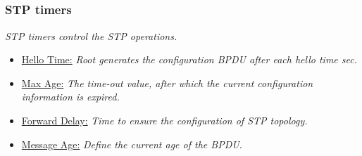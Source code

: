 \documentclass[10pt, blue,subsection=true, compress]{beamer}
\begin{document}
\subsection*{}
\begin{frame} \frametitle{STP timers }
\emph{STP timers control the STP operations.}

\begin{itemize}
\item \underline{ Hello Time:} \emph{Root generates the configuration BPDU after each 
 hello time sec.}


\item \underline{Max Age:} \emph{ The time-out value, after which the current configuration information is expired.}


\item \underline{Forward Delay:} \emph{ Time to ensure the configuration of STP topology.}
\item \underline{Message Age:}  \emph{ Define the current age of the BPDU.}
\end{itemize}

\begin{block} {}
\begin{center}



\end{center}
\end{block}
\end{frame}
\end{document}
